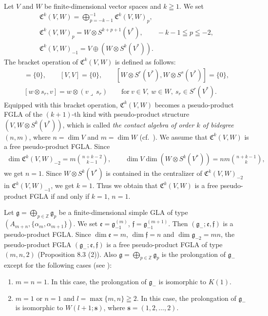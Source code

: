 \documentclass[pdftex]{sigma}
\numberwithin{equation}{section}
\numberwithin{theorem}{section}
\numberwithin{proposition}{section}
\numberwithin{lemma}{section}
\numberwithin{corollary}{section}
\numberwithin{definition}{section}
\numberwithin{example}{section}
\numberwithin{remark}{section}
\numberwithin{note}{section}
\newcommand{\gla}[1]{\mathfrak#1=\bigoplus\limits_{p\in\mathbb Z}\mathfrak#1_p} \renewcommand{\labelenumi}{{\rm (\arabic{enumi})}}
\begin{document}
\begin{example}
Let $V$ and $W$ be f\/inite-dimensional vector spaces and $k\geqq1$.
We set
\begin{gather*}
\mathfrak C^{k}(V,W) =\bigoplus\limits_{p=-k-1}^{-1}\mathfrak C^{k}(V,W)_p, \\
\mathfrak C^{k}(V,W)_p=W\otimes S^{k+p+1}(V^*), \qquad
 -k-1\leqq p\leqq -2, \\
\mathfrak C^{k}(V,W)_{-1} =V\oplus (W\otimes S^{k}(V^*)).
\end{gather*}
The bracket operation of $\mathfrak C^{k}(V,W)$ is def\/ined as follows:
\begin{gather*}
  [W,V]=\{0\},\qquad [V,V]=\{0\}, \qquad [W\otimes S^{r}(V^*),W\otimes S^{s}(V^*)]=\{0\}, \\
[w\otimes s_r,v]=w\otimes (v\lrcorner\,s_r)\qquad \text{for}\  v\in V,\ w\in W,
\ s_r\in S^r(V^*).
\end{gather*}
Equipped with this bracket operation, $\mathfrak C^{k}(V,W)$ becomes
a pseudo-product FGLA of the $(k+1)$-th kind
with pseudo-product structure $(V,W\otimes S^{k}(V^*))$,
which is called
{\it the contact algebra of order $k$ of bidegree} $(n,m)$, where
$n=\dim V$ and $m=\dim W$ (cf.~\cite[p.~133]{yam82:1}).
We assume that $\mathfrak C^{k}(V,W)$ is a free pseudo-product FGLA.
Since
\begin{gather*}
\dim \mathfrak C^{k}(V,W)_{-2}=m\binom{n+k-2}{k-1}, \qquad
\dim V\dim (W\otimes S^{k}(V^*))= nm\binom{n+k-1}{k},
\end{gather*}
we get $n=1$.
Since $W\otimes S^{k}(V^*)$ is contained in the centralizer of
$\mathfrak C^{k}(V,W)_{-2}$
in $\mathfrak C^{k}(V,W)_{-1}$, we get $k=1$.
Thus we obtain that $\mathfrak C^{k}(V,W)$ is a free pseudo-product FGLA
if and only if $k=1$, $n=1$.
\end{example}

\begin{example}\label{ex8.2}
Let $\gla g$ be a f\/inite-dimensional simple GLA of type
$(A_{m+n},\{\alpha_m,\alpha_{m+1}\})$.
We set $\mathfrak e=\mathfrak g_{-1}^{(m)}$, $\mathfrak f=\mathfrak g_{-1}^{(m+1)}$. Then $(\mathfrak g_-;\mathfrak e,\mathfrak f)$
is a pseudo-product FGLA.
Since $\dim \mathfrak e=m$, $\dim\mathfrak f=n$ and
$\dim\mathfrak g_{-2}=mn$, the pseudo-product FGLA
$(\mathfrak g_-;\mathfrak e,\mathfrak f)$ is a free pseudo-product FGLA
of type $(m,n,2)$ (Proposition 8.3 (2)). Also
$\gla g$ is the prolongation of $\mathfrak g_-$ except for the following
cases (see \cite{yam93:1}):
\begin{enumerate}\itemsep=0pt
\item $m=n=1$. In this case,
the prolongation of $\mathfrak g_-$ is isomorphic to $K(1)$.
\item $m=1$ or $n=1$ and $l=\max\{m,n\}\geqq2$. In this case,
the prolongation of $\mathfrak g_-$ is isomorphic to $W(l+1;\bm s)$,
where $\bm s=(1,2,\dots,2)$.
\end{enumerate}
\end{example}
\end{document}
